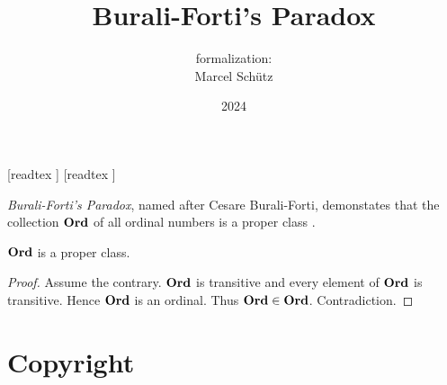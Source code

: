 \documentclass{article}
\title{Burali-Forti's Paradox}
\author{\Naproche formalization: \vspace{0.5em} \\
Marcel Schütz}
\date{2024}
\begin{document}
  \maketitle

  \begin{imports}
    \begin{forthel}
      [readtex ]
      [readtex ]
    \end{forthel}
  \end{imports}
  
  \noindent \emph{Burali-Forti's Paradox}, named after Cesare Burali-Forti, 
  demonstates that the collection $\textbf{Ord}$ of all ordinal numbers is a
  proper class \cite{BuraliForti1897}.

  \begin{forthel}
    \begin{theorem*}\label{burali_forti_paradox}
      $\textbf{Ord}$ is a proper class.
    \end{theorem*}
    \begin{proof}
      Assume the contrary.
      $\textbf{Ord}$ is transitive and every element of $\textbf{Ord}$ is transitive.
      Hence $\textbf{Ord}$ is an ordinal.
      Thus $\textbf{Ord} \in \textbf{Ord}$.
      Contradiction.
    \end{proof}
  \end{forthel}

  \printbibliography

  \section*{Copyright}
  \doclicenseThis
\end{document}
